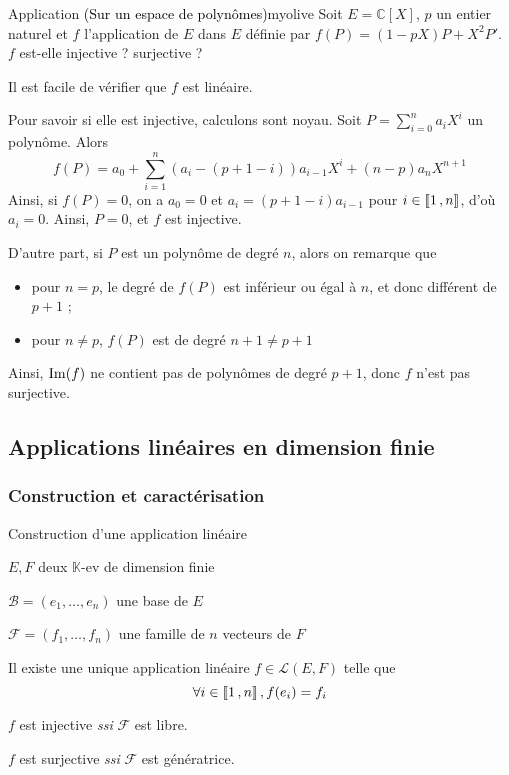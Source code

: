     \begin{omed}{Application \textcolor{black}{(Sur un espace de polynômes)}}{myolive}
        Soit $E = \mathbb{C}[X]$, $p$ un entier naturel et $f$ l’application de $E$ dans $E$ définie par $f(P) = (1 - pX)P + X^2 P'$. $f$ est-elle injective ? surjective ?

        Il est facile de vérifier que $f$ est linéaire. 
        
        Pour savoir si elle est injective, calculons sont noyau. Soit $P = \sum_{i=0}^{n} a_i X^i$ un polynôme. Alors 
        \[ f(P) = a_0 + \sum_{i=1}^{n} (a_i - (p+1-i))a_{i-1} X^i + (n-p)a_n X^{n+1} \]   
        Ainsi, si $f(P) = 0$, on a $a_0 = 0$ et $a_i = (p + 1 - i)a_{i - 1}$ pour $i \in \left\llbracket 1 \, , n \right\rrbracket$, d’où $a_i = 0$. Ainsi, $P = 0$, et $f$ est injective.
        
        D’autre part, si $P$ est un polynôme de degré $n$, alors on remarque que 
        \begin{itemize}
            \item pour $n = p$, le degré de $f(P)$ est inférieur ou égal à $n$, et donc différent de $p+1$ ;
            \item pour $n \neq p$, $f(P)$ est de degré $n + 1 \neq p+ 1$
        \end{itemize}
        Ainsi, $\operatorname{Im}(f)$ ne contient pas de polynômes de degré $p + 1$, donc $f$ n’est pas surjective.
    \end{omed}

\subsection{Applications linéaires en dimension finie}

    \subsubsection{Construction et caractérisation}

    \begin{theo}{Construction d’une application linéaire}{}
        \begin{soient}
            \item $E,F$ deux $\mathbb{K}$-ev de dimension finie
            \item $\mathcal{B} = (e_1, \ldots, e_n)$ une base de $E$
            \item $\mathcal{F} = (f_1,\ldots,f_n)$ une famille de $n$ vecteurs de $F$ 
        \end{soient}
        \begin{alors}
            \item Il existe une unique application linéaire $f \in \mathcal{L}(E,F)$ telle que 
            \[ \forall i \in \left\llbracket 1 \, , n \right\rrbracket, f(e_i) = f_i \]
            \item $f$ est injective \textit{ssi} $\mathcal{F}$ est libre.
            \item $f$ est surjective \textit{ssi} $\mathcal{F}$ est génératrice.
        \end{alors}
    \end{theo}

